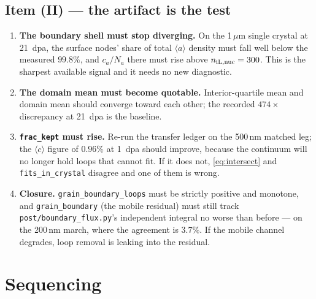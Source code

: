 \documentclass[11pt]{article}
\newcommand{\aloop}{\ensuremath{\langle a\rangle}}
\newcommand{\cloop}{\ensuremath{\langle c\rangle}}
\newcommand{\fbk}{\discretionary{}{}{}}   %
\newcommand{\file}[1]{\texttt{\small #1}}
\begin{document}
\subsection{Item (II) --- the artifact is the test}
\begin{enumerate}
\item \textbf{The boundary shell must stop diverging.}  On the 1\,$\mu$m
  single crystal at 21~dpa, the surface nodes' share of total \aloop{} density
  must fall well below the measured $99.8\%$, and $c_a/N_a$ there must rise
  above $n_{\rm iL,nuc}=300$.  This is the sharpest available signal and it
  needs no new diagnostic.
\item \textbf{The domain mean must become quotable.}  Interior-quartile mean
  and domain mean should converge toward each other; the recorded $474\times$
  discrepancy at 21~dpa is the baseline.
\item \textbf{\texttt{frac\_kept} must rise.}  Re-run the transfer ledger on
  the 500\,nm matched leg; the \cloop{} figure of $0.96\%$ at 1~dpa should
  improve, because the continuum will no longer hold loops that cannot fit.
  If it does not, \eqref{eq:intersect} and \verb|fits_in_crystal| disagree and
  one of them is wrong.
\item \textbf{Closure.}  \verb|grain_boundary_loops| must be strictly positive
  and monotone, and \verb|grain_boundary| (the mobile residual) must still
  track \file{post/\fbk boundary\_\fbk flux.\fbk py}'s independent integral no
  worse than before --- on the 200\,nm march, where the agreement is $3.7\%$.
  If the mobile channel degrades, loop removal is leaking into the residual.
\end{enumerate}

\section{Sequencing}
\end{document}
